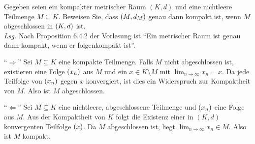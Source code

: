 \documentclass{scrreprt}
\begin{document}
\newpage
\noindent
Gegeben seien ein kompakter metrischer Raum $(K, d)$ und eine nichtleere
Teilmenge $M \subseteq K$.
Beweisen Sie, dass $\qty(M, d_M)$ genau dann kompakt ist, wenn $M$ abgeschlossen
in $\qty(K, d)$ ist. \\

\textit{Lsg.} Nach Proposition 6.4.2 der Vorlesung ist
``Ein metrischer Raum ist genau dann kompakt, wenn er folgenkompakt ist''.

``$\Rightarrow$'' Sei $M \subseteq K$ eine kompakte Teilmenge.
Falls $M$ nicht abgeschlossen ist, existieren eine Folge $\qty(x_n)$ aus $M$
und ein $x \in K \setminus M$ mit $\lim_{n \to \infty} x_n = x$.
Da jede Teilfolge von $\qty(x_n)$ gegen $x$ konvergiert, ist dies ein
Widerspruch zur Kompaktheit von $M$.
Also ist $M$ abgeschlossen.

``$\Leftarrow$'' Sei $M \subseteq K$ eine nichtleere, abgeschlossene Teilmenge
und $\qty(x_n)$ eine Folge aus $M$.
Aus der Kompaktheit von $K$ folgt die Existenz einer in $(K, d)$ konvergenten
Teilfolge $\qty(x)$.
Da $M$ abgeschlossen ist, liegt $\lim_{n \to \infty} x_n \in M$.
Also ist $M$ kompakt.
\end{document}
